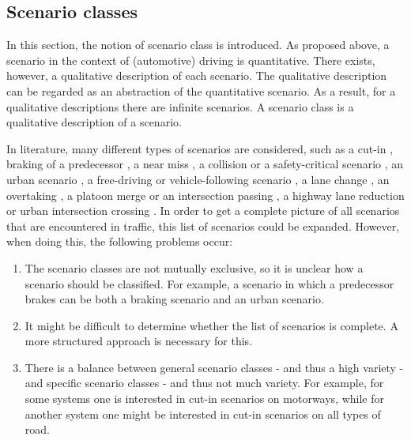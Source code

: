 \subsection{Scenario classes}
In this section, the notion of scenario class is introduced. As proposed above, a scenario in the context of (automotive) driving is quantitative. There exists, however, a qualitative description of each scenario. The qualitative description can be regarded as an abstraction of the quantitative scenario. As a result, for a qualitative descriptions there are infinite scenarios. A scenario class is a qualitative description of a scenario. 

In literature, many different types of scenarios are considered, such as a cut-in \cite{xu2002effects, gietelink2006development,roesener2017comprehensive}, braking of a predecessor \cite{xu2002effects,deGelder2017assessment,hulshof2013autonomous}, a near miss \cite{gietelink2006development}, a collision or a safety-critical scenario \cite{gietelink2006development,ebner2011identifying}, an urban scenario \cite{zofka2015datadrivetrafficscenarios}, a free-driving or vehicle-following scenario \cite{roesener2017comprehensive}, a lane change \cite{roesener2017comprehensive}, an overtaking \cite{karaduman2013interactivebehavior}, a platoon merge or an intersection passing \cite{englund2016grand}, a highway lane reduction or urban intersection crossing \cite{ploeg2017GCDC}. In order to get a complete picture of all scenarios that are encountered in traffic, this list of scenarios could be expanded. However, when doing this, the following problems occur:

\begin{enumerate}
	\item The scenario classes are not mutually exclusive, so it is unclear how a scenario should be classified. For example, a scenario in which a predecessor brakes can be both a braking scenario and an urban scenario. \label{item:mutual exclusiveness}
	\item It might be difficult to determine whether the list of scenarios is complete. A more structured approach is necessary for this. \label{item:completeness}
	\item There is a balance between general scenario classes - and thus a high variety - and specific scenario classes - and thus not much variety. For example, for some systems one is interested in cut-in scenarios on motorways, while for another system one might be interested in cut-in scenarios on all types of road. \label{item:generality}
\end{enumerate}

